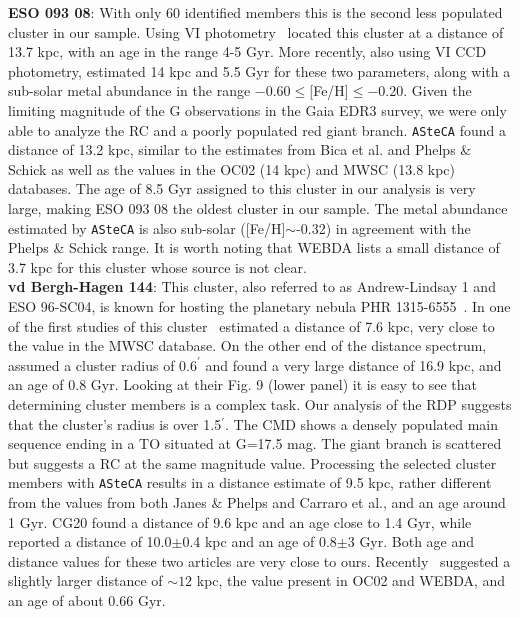 \documentclass[referee]{aa}
\begin{document}
  \noindent \textbf{ESO 093 08}: With only 60 identified members this is the second less
  populated cluster in our sample. Using VI photometry~\cite{Bica_1999} located
  this cluster at a distance of 13.7 kpc, with an age in the range 4-5 Gyr.
  More recently, also using VI CCD photometry, \cite{Phelps_2003} estimated 14
  kpc and 5.5 Gyr for these two parameters, along with a sub-solar metal
  abundance in the range $-0.60\leq$[Fe/H]$\leq-0.20$.
  Given the limiting magnitude of the G observations in the Gaia EDR3 survey, we
  were only able to analyze the RC and a poorly populated red giant branch.
  \texttt{ASteCA} found a distance of 13.2 kpc, similar to the estimates from
  Bica et al. and Phelps \& Schick as well as the values in the OC02 (14 kpc)
  and MWSC (13.8 kpc) databases.
  The age of 8.5 Gyr assigned to this cluster in our analysis is very
  large, making ESO 093 08 the oldest cluster in our sample. The metal
  abundance estimated by \texttt{ASteCA} is also sub-solar ([Fe/H]$\sim$-0.32)
  in agreement with the Phelps \& Schick range. It is worth noting that WEBDA
  lists a small distance of 3.7 kpc for this cluster whose source is not
  clear.\\

  \noindent \textbf{vd Bergh-Hagen 144}: This cluster, also referred to as Andrew-Lindsay
  1 and ESO 96-SC04, is known for hosting the planetary nebula PHR
  1315-6555~\citep{Parker_2011}.
  In one of the first studies of this cluster~\cite{Janes_1994} estimated a
  distance of 7.6 kpc, very close to the value in the MWSC database. On the
  other end of the distance spectrum,
  \cite{Carraro_2005_neglected} assumed a cluster radius of $0.6^{\prime}$ and
  found a very large distance of 16.9 kpc, and an age of 0.8 Gyr. Looking at
  their Fig. 9 (lower panel) it is easy to see that determining cluster members
  is a complex task. Our analysis of the RDP suggests that the cluster's radius
  is over 1.5$^{\prime}$. The CMD shows a densely populated main sequence ending
  in a TO situated at G=17.5 mag. The giant branch is scattered but suggests a
  RC at the same magnitude value.
  Processing the selected cluster members with \texttt{ASteCA} results in a
  distance estimate of 9.5 kpc, rather different from the values
  from both Janes \& Phelps and Carraro et al., and an age around 1 Gyr.
  CG20 found a distance of 9.6 kpc and an age close to 1.4 Gyr,
  while~\cite{Majaess_2014} reported a distance of 10.0$\pm$0.4 kpc and an
  age of 0.8$\pm$3 Gyr. Both age and distance values for these two articles are
  very close to ours. Recently~\cite{Fragkou_2019} suggested a slightly larger
  distance of $\sim12$ kpc, the value present in OC02 and WEBDA, and an age of
  about 0.66 Gyr.\\
\end{document}
